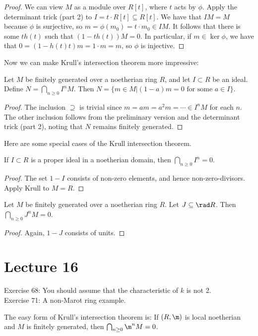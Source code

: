  \begin{proof}
   We can view $M$ as a module over $R[t]$, where $t$ acts by $\phi$. Apply the
   determinant trick (part 2) to $I=t\cdot R[t]\subseteq R[t]$. We have that $IM=M$
   because $\phi$ is surjective, so $m =\phi(m_0)=t\cdot m_0\in IM$. It follows that
   there is some $th(t)$ such that $(1-th(t))M=0$. In particular, if $m\in  \ker \phi$,
   we have that $0=(1-h(t)t)m=1\cdot m=m$, so $\phi$ is injective.
 \end{proof}
 Now we can make Krull's intersection theorem more impressive:
 \begin{theorem}
   Let $M$ be finitely generated over a noetherian ring $R$, and let $I\subset R$ be an ideal.
   Define $N = \bigcap_{n\ge 0} I^nM$. Then $N=\{m\in M|(1-a)m=0\text{ for some } a\in
   I\}$.
 \end{theorem}
 \begin{proof}
   The inclusion $\supseteq$ is trivial since $m=am=a^2m=\cdots \in I^nM$ for each $n$.
   The other inclusion follows from the preliminary version and the determinant trick
   (part 2), noting that $N$ remains finitely generated.
 \end{proof}
 Here are some special cases of the Krull intersection theorem.
 \begin{corollary}
   If $I\subset R$ is a proper ideal in a noetherian domain, then $\bigcap_{n\ge 0} I^n=0$.
 \end{corollary}
 \begin{proof}
   The set $1-I$ consists of non-zero elements, and hence non-zero-divisors. Apply Krull
   to $M=R$.
 \end{proof}
 \begin{corollary}
   Let $M$ be finitely generated over a noetherian ring $R$. Let $J\subseteq \rad R$.
   Then $\bigcap_{n\ge 0} J^nM=0$.
 \end{corollary}
 \begin{proof}
   Again, $1-J$ consists of units.
 \end{proof}
 \setcounter{lecture}{16}
 \section{Lecture 16}

 \noindent
 Exercise 68: You should assume that the characteristic of $k$ is not 2.\\
 Exercise 71: A non-Marot ring example.

 The easy form of Krull's intersection theorem is: If $(R,\m)$ is local noetherian and
 $M$ is finitely generated, then $\bigcap_{n\ge 0} \m^n M=0$.

